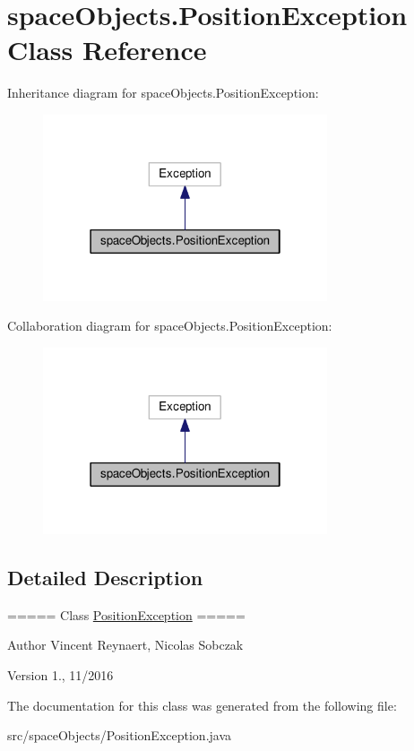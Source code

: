 \hypertarget{classspace_objects_1_1_position_exception}{}\section{space\+Objects.\+Position\+Exception Class Reference}
\label{classspace_objects_1_1_position_exception}


Inheritance diagram for space\+Objects.\+Position\+Exception\+:\nopagebreak
\begin{figure}[H]
\begin{center}
\leavevmode
\includegraphics[width=238pt]{classspace_objects_1_1_position_exception__inherit__graph}
\end{center}
\end{figure}


Collaboration diagram for space\+Objects.\+Position\+Exception\+:\nopagebreak
\begin{figure}[H]
\begin{center}
\leavevmode
\includegraphics[width=238pt]{classspace_objects_1_1_position_exception__coll__graph}
\end{center}
\end{figure}


\subsection{Detailed Description}
===== Class \hyperlink{classspace_objects_1_1_position_exception}{Position\+Exception} =====

\begin{DoxyAuthor}{Author}
Vincent Reynaert, Nicolas Sobczak 
\end{DoxyAuthor}
\begin{DoxyVersion}{Version}
1., 11/2016 
\end{DoxyVersion}


The documentation for this class was generated from the following file\+:\begin{DoxyCompactItemize}
\item 
src/space\+Objects/Position\+Exception.\+java\end{DoxyCompactItemize}
